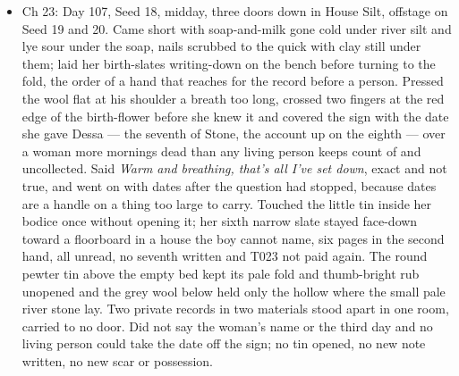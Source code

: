 \documentclass{design/chronicle}
\begin{document}
{\begin{itemize}[leftmargin=1.4em,itemsep=1pt,topsep=3pt,parsep=0pt]
\item Ch 23: Day 107, Seed 18, midday, three doors down in House Silt, offstage on Seed 19 and 20. Came short with soap-and-milk gone cold under river silt and lye sour under the soap, nails scrubbed to the quick with clay still under them; laid her birth-slates writing-down on the bench before turning to the fold, the order of a hand that reaches for the record before a person. Pressed the wool flat at his shoulder a breath too long, crossed two fingers at the red edge of the birth-flower before she knew it and covered the sign with the date she gave Dessa — the seventh of Stone, the account up on the eighth — over a woman more mornings dead than any living person keeps count of and uncollected. Said \emph{Warm and breathing, that’s all I’ve set down}, exact and not true, and went on with dates after the question had stopped, because dates are a handle on a thing too large to carry. Touched the little tin inside her bodice once without opening it; her sixth narrow slate stayed face-down toward a floorboard in a house the boy cannot name, six pages in the second hand, all unread, no seventh written and T023 not paid again. The round pewter tin above the empty bed kept its pale fold and thumb-bright rub unopened and the grey wool below held only the hollow where the small pale river stone lay. Two private records in two materials stood apart in one room, carried to no door. Did not say the woman’s name or the third day and no living person could take the date off the sign; no tin opened, no new note written, no new scar or possession.

\end{itemize}

\begin{itemize}[leftmargin=1.4em,itemsep=1pt,topsep=3pt,parsep=0pt]


\end{itemize}}
\end{document}
